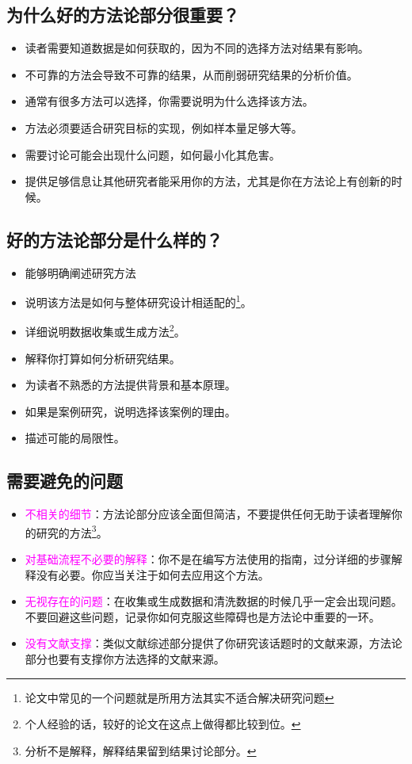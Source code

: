 \documentclass[cn,hazy,blue,14pt,screen]{elegantnote} %
\begin{document}
\subsection{为什么好的方法论部分很重要？}

\begin{itemize}
  \item 读者需要知道数据是如何获取的，因为不同的选择方法对结果有影响。
  \item 不可靠的方法会导致不可靠的结果，从而削弱研究结果的分析价值。
  \item 通常有很多方法可以选择，你需要说明为什么选择该方法。
  \item 方法必须要适合研究目标的实现，例如样本量足够大等。
  \item 需要讨论可能会出现什么问题，如何最小化其危害。
  \item 提供足够信息让其他研究者能采用你的方法，尤其是你在方法论上有创新的时候。
\end{itemize}

\subsection{好的方法论部分是什么样的？}

\begin{itemize}
  \item 能够明确阐述研究方法
  \item 说明该方法是如何与整体研究设计相适配的\footnote{论文中常见的一个问题就是所用方法其实不适合解决研究问题}。
  \item 详细说明数据收集或生成方法\footnote{个人经验的话，较好的论文在这点上做得都比较到位。}。
  \item 解释你打算如何分析研究结果。
  \item 为读者不熟悉的方法提供背景和基本原理。
  \item 如果是案例研究，说明选择该案例的理由。
  \item 描述可能的局限性。
\end{itemize}

\subsection{需要避免的问题}

\begin{itemize}
  \item \textcolor{magenta}{不相关的细节}：方法论部分应该全面但简洁，不要提供任何无助于读者理解你的研究的方法\footnote{分析不是解释，解释结果留到结果讨论部分。}。
  \item \textcolor{magenta}{对基础流程不必要的解释}：你不是在编写方法使用的指南，过分详细的步骤解释没有必要。你应当关注于如何去应用这个方法。
  \item \textcolor{magenta}{无视存在的问题}：在收集或生成数据和清洗数据的时候几乎一定会出现问题。不要回避这些问题，记录你如何克服这些障碍也是方法论中重要的一环。
  \item \textcolor{magenta}{没有文献支撑}：类似文献综述部分提供了你研究该话题时的文献来源，方法论部分也要有支撑你方法选择的文献来源。
\end{itemize}
\end{document}
